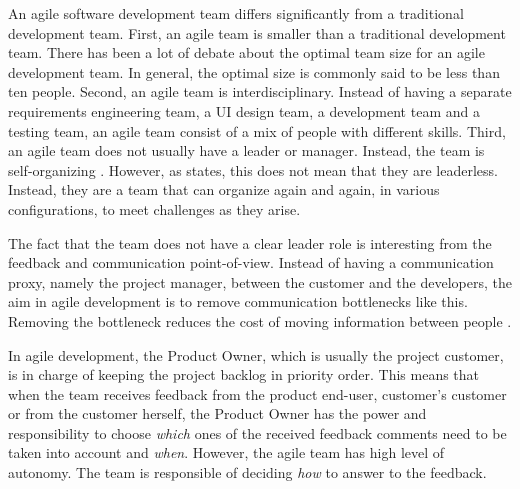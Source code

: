 \documentclass[english,12pt,a4paper,pdftex]{article}
\begin{document}
An agile software development team differs significantly from a traditional development team. First, an agile team is smaller than a traditional development team. There has been a lot of debate about the optimal team size for an agile development team. In general, the optimal size is commonly said to be less than ten people. Second, an agile team is interdisciplinary. Instead of having a separate requirements engineering team, a \ac{UI} design team, a development team and a testing team, an agile team consist of a mix of people with different skills. Third, an agile team does not usually have a leader or manager. Instead, the team is self-organizing \citep{cockburn2001}. However, as \citet{cockburn2001} states, this does not mean that they are leaderless. Instead, they are a team that can organize again and again, in various configurations, to meet challenges as they arise.

The fact that the team does not have a clear leader role is interesting from the feedback and communication point-of-view. Instead of having a communication proxy, namely the project manager, between the customer and the developers, the aim in agile development is to remove communication bottlenecks like this. Removing the bottleneck reduces the cost of moving information between people \citep{cockburn2001}.

In agile development, the Product Owner, which is usually the project customer, is in charge of keeping the project backlog in priority order. This means that when the team receives feedback from the product end-user, customer's customer or from the customer herself, the Product Owner has the power and responsibility to choose \emph{which} ones of the received feedback comments need to be taken into account and \emph{when}. However, the agile team has high level of autonomy. The team is responsible of deciding \emph{how} to answer to the feedback. 

\end{document}
